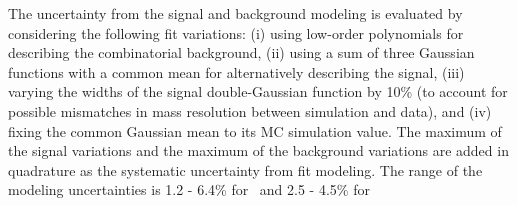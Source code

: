The uncertainty from the signal and background modeling is evaluated by considering the following fit variations:
(i) using low-order polynomials for describing the combinatorial background, 
(ii) using a sum of three Gaussian functions with a common mean for alternatively describing the signal,
(iii) varying the widths of the signal double-Gaussian function by 10\% (to account for possible mismatches in mass resolution between simulation and data), and
(iv) fixing the common Gaussian mean to its MC simulation value. 
The maximum of the signal variations and the maximum of the background variations are added in quadrature as the systematic uncertainty from fit modeling. The range of the modeling uncertainties is 1.2 - 6.4\% for \PBzs\ and 2.5 - 4.5\% for \PB\


